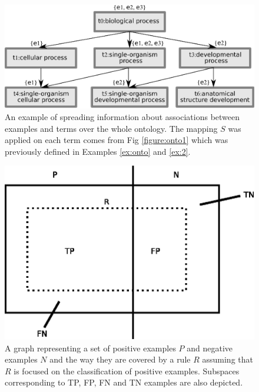 \documentclass{bmcart}
\begin{document}
\begin{backmatter}
\begin{figure}[h!]
\caption{\csentence{} An example of spreading information about associations between examples and terms over the whole ontology. The mapping $S$ was applied on each term comes from Fig \ref{figure:onto1} which was previously defined in Examples \ref{ex:onto} and \ref{ex:2}.}
\label{figure:onto2}
\includegraphics{Fig2.eps}
\end{figure}

\begin{figure}[h!]
\caption{\csentence{} A graph representing a set of positive examples $P$ and negative examples $N$ and the way they are covered by a rule $R$ assuming that $R$ is focused on the classification of positive examples. Subspaces corresponding to TP, FP, FN and TN examples are also depicted.}
\label{figure:cover_space_acc}
\includegraphics{Fig3.eps}
\end{figure}


\end{backmatter}
\end{document}
